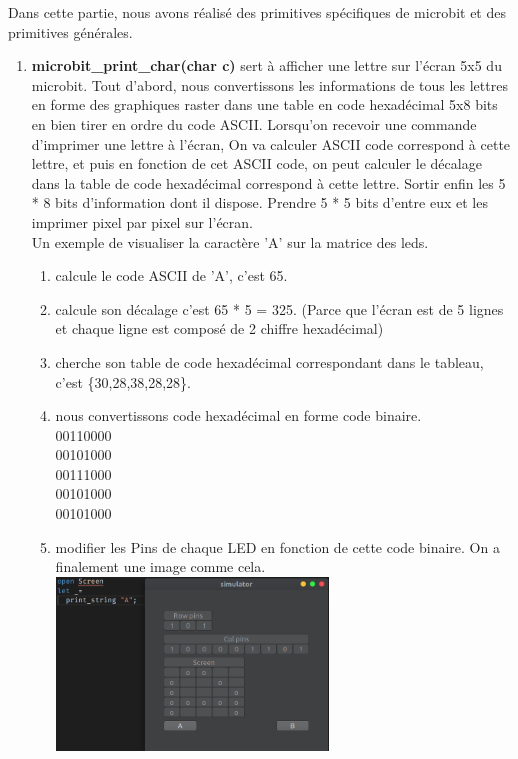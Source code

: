 \documentclass[14px]{article}
\begin{document}
	Dans cette partie, nous avons réalisé des primitives spécifiques de microbit et des primitives générales.
	\begin{enumerate}
		\item \textbf{microbit\_print\_char(char c)} sert à afficher une lettre sur l'écran 5x5 du microbit.
		Tout d'abord, nous convertissons les informations de tous les lettres en forme des graphiques raster dans une table en code hexadécimal 5x8 bits en bien tirer en ordre du code ASCII. Lorsqu'on recevoir une commande d'imprimer une lettre à l'écran,
		On va calculer ASCII code correspond à cette lettre, et puis en fonction de cet ASCII code, on peut calculer le décalage dans la table de code hexadécimal correspond à cette lettre. Sortir enfin les 5 * 8 bits d'information dont il dispose. Prendre 5 * 5 bits d'entre eux et les imprimer pixel par pixel sur l'écran.\\
		
		Un exemple de visualiser la caractère 'A' sur la matrice des leds.
		\begin{enumerate}
			\item calcule le code ASCII de 'A', c'est 65.
			\item calcule son décalage c'est 65 * 5 = 325. (Parce que l'écran est de 5 lignes et chaque ligne est composé de 2 chiffre hexadécimal)
			\item cherche son table de code hexadécimal correspondant dans le tableau, c'est \{30,28,38,28,28\}.
			\item nous convertissons code hexadécimal en forme code binaire.\\
			00110000\\
			00101000\\
			00111000\\
			00101000\\
			00101000
			\item modifier les Pins de chaque LED en fonction de cette code binaire. On a finalement une image comme cela.\\
			\includegraphics[width=0.6\textwidth]{printA.png}\\[1cm]
		\end{enumerate}
		

\end{enumerate}
\end{document}
